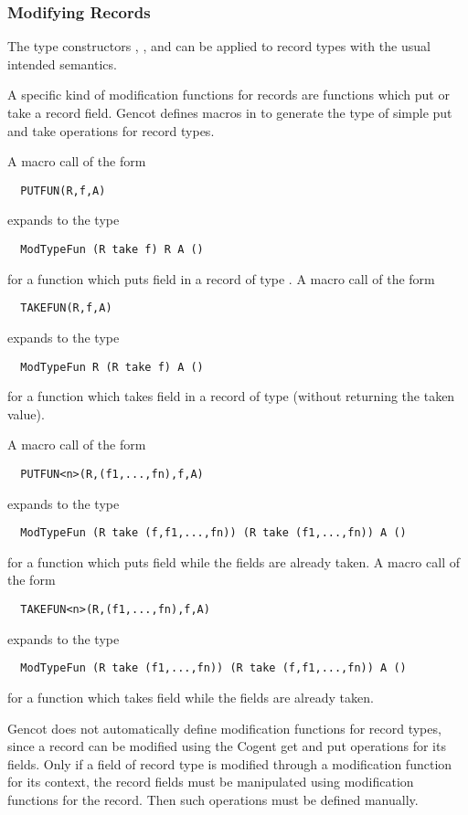 \subsubsection{Modifying Records}

The type constructors , , and  can be applied to record types with the 
usual intended semantics. 

A specific kind of modification functions for records are functions which put or take a record field. 
Gencot defines macros in  to generate the type of simple put and take operations for
record types.

A macro call of the form 
\begin{verbatim}
  PUTFUN(R,f,A)
\end{verbatim}
expands to the type
\begin{verbatim}
  ModTypeFun (R take f) R A ()
\end{verbatim}
for a function which puts field  in a record of type . A macro call of the form
\begin{verbatim}
  TAKEFUN(R,f,A)
\end{verbatim}
expands to the type
\begin{verbatim}
  ModTypeFun R (R take f) A ()
\end{verbatim}
for a function which takes field  in a record of type  (without returning the taken value).

A macro call of the form 
\begin{verbatim}
  PUTFUN<n>(R,(f1,...,fn),f,A)
\end{verbatim}
expands to the type
\begin{verbatim}
  ModTypeFun (R take (f,f1,...,fn)) (R take (f1,...,fn)) A ()
\end{verbatim}
for a function which puts field  while the fields  are already taken. A macro call of the form
\begin{verbatim}
  TAKEFUN<n>(R,(f1,...,fn),f,A)
\end{verbatim}
expands to the type
\begin{verbatim}
  ModTypeFun (R take (f1,...,fn)) (R take (f,f1,...,fn)) A ()
\end{verbatim}
for a function which takes field  while the fields  are already taken.

Gencot does not automatically define modification functions for record types, since a record can be modified using the
Cogent get and put operations for its fields. Only if a field of record type is modified through a modification function for 
its context, the record fields
must be manipulated using modification functions for the record. Then such operations must be defined manually.

